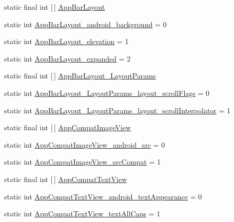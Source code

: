 \begin{DoxyCompactItemize}
\item 
static final int \mbox{[}$\,$\mbox{]} \hyperlink{classandroid_1_1support_1_1design_1_1R_1_1styleable_ad4af8881949a584d986f4bfadb3e8482}{App\+Bar\+Layout}
\item 
static int \hyperlink{classandroid_1_1support_1_1design_1_1R_1_1styleable_a6b21dc33a1ed1fa9304d0eae8bdb7d81}{App\+Bar\+Layout\+\_\+android\+\_\+background} = 0
\item 
static int \hyperlink{classandroid_1_1support_1_1design_1_1R_1_1styleable_a46ec88e27c8abc55f395a719f90aa284}{App\+Bar\+Layout\+\_\+elevation} = 1
\item 
static int \hyperlink{classandroid_1_1support_1_1design_1_1R_1_1styleable_a2a5c8e6f3224750307ec9d99f8d5b551}{App\+Bar\+Layout\+\_\+expanded} = 2
\item 
static final int \mbox{[}$\,$\mbox{]} \hyperlink{classandroid_1_1support_1_1design_1_1R_1_1styleable_af35cb615b571fb6d447bc930baeae71d}{App\+Bar\+Layout\+\_\+\+Layout\+Params}
\item 
static int \hyperlink{classandroid_1_1support_1_1design_1_1R_1_1styleable_a74a85544b430e28f06360cfcd794314d}{App\+Bar\+Layout\+\_\+\+Layout\+Params\+\_\+layout\+\_\+scroll\+Flags} = 0
\item 
static int \hyperlink{classandroid_1_1support_1_1design_1_1R_1_1styleable_a5f19dcedddd78f620c09f1472fdc29e8}{App\+Bar\+Layout\+\_\+\+Layout\+Params\+\_\+layout\+\_\+scroll\+Interpolator} = 1
\item 
static final int \mbox{[}$\,$\mbox{]} \hyperlink{classandroid_1_1support_1_1design_1_1R_1_1styleable_ada1b5e4475936c9e01181fdb4d8cb6c9}{App\+Compat\+Image\+View}
\item 
static int \hyperlink{classandroid_1_1support_1_1design_1_1R_1_1styleable_a3497943f12dbcc3cd4d6b241872b3035}{App\+Compat\+Image\+View\+\_\+android\+\_\+src} = 0
\item 
static int \hyperlink{classandroid_1_1support_1_1design_1_1R_1_1styleable_a1776714cccff6963241afa595ebb669d}{App\+Compat\+Image\+View\+\_\+src\+Compat} = 1
\item 
static final int \mbox{[}$\,$\mbox{]} \hyperlink{classandroid_1_1support_1_1design_1_1R_1_1styleable_a4f8449fe92fa53cd1fd4547247fe52b6}{App\+Compat\+Text\+View}
\item 
static int \hyperlink{classandroid_1_1support_1_1design_1_1R_1_1styleable_a0725f046136b2f197dab6b21f51b82bf}{App\+Compat\+Text\+View\+\_\+android\+\_\+text\+Appearance} = 0
\item 
static int \hyperlink{classandroid_1_1support_1_1design_1_1R_1_1styleable_ad008c51e469121e889f4880c5d72f62c}{App\+Compat\+Text\+View\+\_\+text\+All\+Caps} = 1

\end{DoxyCompactItemize}
